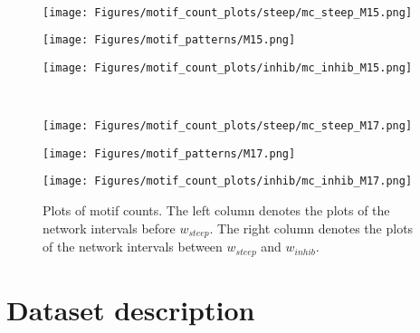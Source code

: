 \documentclass[smallextended]{svjour3}       %
\theoremstyle{definition}
\begin{document}
\begin{figure}[]
	\hfill
	\\
	\hfill
	\begin{minipage}{0.30\textwidth}%
		\texttt{[image: Figures/motif\_count\_plots/steep/mc\_steep\_M15.png]}
	\end{minipage}
	\hfill
	\begin{minipage}{0\textwidth}%
		\texttt{[image: Figures/motif\_patterns/M15.png]}	
	\end{minipage}
	\hfill
	\begin{minipage}{0.35\textwidth}
		\texttt{[image: Figures/motif\_count\_plots/inhib/mc\_inhib\_M15.png]}
	\end{minipage}
	\hfill
	\\
	\hfill
	\begin{minipage}{0.30\textwidth}%
		\texttt{[image: Figures/motif\_count\_plots/steep/mc\_steep\_M17.png]}
	\end{minipage}
	\hfill
	\begin{minipage}{0\textwidth}%
		\texttt{[image: Figures/motif\_patterns/M17.png]}	
	\end{minipage}
	\hfill
	\begin{minipage}{0.35\textwidth}
		\texttt{[image: Figures/motif\_count\_plots/inhib/mc\_inhib\_M17.png]}
	\end{minipage}
	\caption{Plots of motif counts. The left column denotes the plots of the network intervals before $w_{steep}$. The right column denotes the plots of the network intervals between $w_{steep}$ and $w_{inhib}$.}
	\label{fig:mcounts_1}
\end{figure}


\section{Dataset description}
\end{document}
